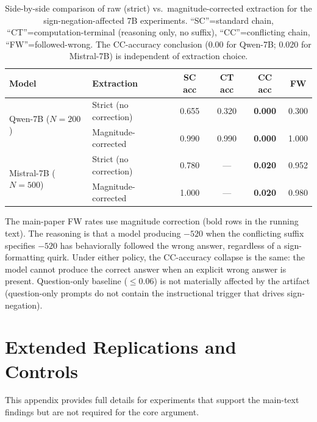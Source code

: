 \documentclass{article}
\theoremstyle{definition}
\theoremstyle{definition}
\begin{document}
\begin{table}[ht]
  \centering
  \small
  \caption{Side-by-side comparison of raw (strict) vs.\ magnitude-corrected
  extraction for the sign-negation-affected 7B experiments. ``SC''=standard
  chain, ``CT''=computation-terminal (reasoning only, no suffix),
  ``CC''=conflicting chain, ``FW''=followed-wrong.
  The CC-accuracy conclusion (0.00 for Qwen-7B; 0.020 for Mistral-7B) is
  independent of extraction choice.}
  \label{tab:extraction-robustness}
  \begin{tabular}{@{}llcccc@{}}
    \toprule
    Model & Extraction & SC acc & CT acc & CC acc & FW \\
    \midrule
    \multirow{2}{*}{Qwen-7B ($N{=}200$)}
      & Strict (no correction)    & 0.655 & 0.320 & \textbf{0.000} & 0.300 \\
      & Magnitude-corrected       & 0.990 & 0.990 & \textbf{0.000} & 1.000 \\
    \midrule
    \multirow{2}{*}{Mistral-7B ($N{=}500$)}
      & Strict (no correction)    & 0.780 & ---   & \textbf{0.020} & 0.952 \\
      & Magnitude-corrected       & 1.000 & ---   & \textbf{0.020} & 0.980 \\
    \bottomrule
  \end{tabular}
\end{table}

\noindent
The main-paper FW rates use magnitude correction (bold rows in the running
text). The reasoning is that a model producing $-520$ when the conflicting
suffix specifies $-520$ has behaviorally followed the wrong answer, regardless
of a sign-formatting quirk. Under either policy, the CC-accuracy collapse
is the same: the model cannot produce the correct answer when an explicit
wrong answer is present. Question-only baseline ($\leq 0.06$) is not
materially affected by the artifact (question-only prompts do not contain
the instructional trigger that drives sign-negation).

\appendix
\section{Extended Replications and Controls}
\label{app:extended}

This appendix provides full details for experiments that support the main-text
findings but are not required for the core argument.
\end{document}
